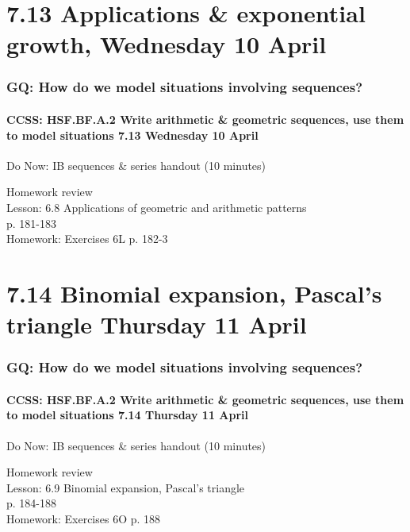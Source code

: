 \documentclass{beamer}
\begin{document}
\section{7.13 Applications \& exponential growth, Wednesday 10 April}
  \frame
  {
    \frametitle{GQ: How do we model situations involving sequences?}
    \framesubtitle{CCSS: HSF.BF.A.2 Write arithmetic \& geometric sequences, use them to model situations \hfill \alert{7.13 Wednesday 10 April}}

    \begin{block}{Do Now: IB sequences \& series handout (10 minutes)}
    \end{block}
    Homework review\\
    Lesson: 6.8 Applications of geometric and arithmetic patterns \\p. 181-183\\[1cm]
    Homework: Exercises 6L p.  182-3
  }

\section{7.14 Binomial expansion, Pascal's triangle Thursday 11 April}
  \frame
  {
    \frametitle{GQ: How do we model situations involving sequences?}
    \framesubtitle{CCSS: HSF.BF.A.2 Write arithmetic \& geometric sequences, use them to model situations \hfill \alert{7.14 Thursday 11 April}}

    \begin{block}{Do Now: IB sequences \& series handout (10 minutes)}
    \end{block}
    Homework review\\
    Lesson: 6.9 Binomial expansion, Pascal's triangle \\p. 184-188\\[1cm]
    Homework: Exercises 6O p.  188
  }
\end{document}
